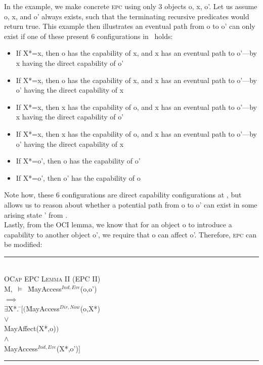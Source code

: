 \documentclass[a4paper,11pt, twoside,twocolumn]{article}
\newenvironment{logic}
{\begin{minipage}[c]{\linewidth}  \small \vspace{0.5em}\begin{tabbing}}
{\end{tabbing}\end{minipage}\vspace{0.5em}}
\newcommand{\loexists}{$\exists$}
\newcommand{\loand}{$\land$}
\newcommand{\loor} {$\lor$}
\newcommand{\loimplies}{$\implies$}
\newcommand{\losigma}{\text{$\upsigma$}}
\newcommand{\loturns} {$\vDash$}
\newcommand{\hr}{\rule{\linewidth}{0.4pt}}
\begin{document}
In the example, we make concrete \textsc{epc} using only 3 objects o, x, o'. Let us assume o, x, and o' always exists, such that the terminating recursive predicates would return true. This example then illustrates an eventual path from o to o' can only exist if one of these present 6 configurations in \losigma\ holds:
\begin{itemize}\setlength\itemsep{0.5em}
\item If X*=x, then o has the capability of x, and x has an eventual path to o'---\subitem by x having the direct capability of o'
\item If X*=x, then o has the capability of x, and x has an eventual path to o'---\subitem by o' having the direct capability of x
\item If X*=x, then x has the capability of o, and x has an eventual path to o'---\subitem by x having the direct capability of o'
\item If X*=x, then x has the capability of o, and x has an eventual path to o'---\subitem by o' having the direct capability of x
\item If X*=o', then o has the capability of o'
\item If X*=o', then o' has the capability of o
\end{itemize}
Note how, these 6 configurations are direct capability configurations at \losigma, but allows us to reason about whether a potential path from o to o' can exist in some arising state \losigma' from \losigma.\\

Lastly, from the OCI lemma, we know that for an object o to introduce a capability to another object o', we require that o can affect o'. Therefore, \textsc{epc} can be modified:

\begin{logic}
\hr\\
\textsc{\normalsize *OCap EPC Lemma II (EPC II)}\\
M,\losigma\ \loturns\ \=MayAccess$^{Ind,Eve}$(o,o')\\
\> \loimplies\\
\> \loexists X*. \=$[ ($\=MayAccess$^{Dir,Now}$(o,X*)\\
\>\>\> \loor \\
\>\>\> MayAffect(X*,o)$)$\\
\>\>\loand \\
\>\>MayAccess$^{Ind,Eve}$(X*,o')$ ]$\\
\hr
\end{logic}
\end{document}
